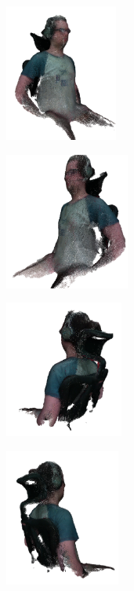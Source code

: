 \begin{figure}[h]
    \centering
    \begin{subfigure}[t]{0.2\textheight}
    	\centering
        \includegraphics[height=4.5cm]{archivos/experimentacion-4-resultado-nube.png}
    \end{subfigure}
    \begin{subfigure}[t]{0.2\textheight}
    	\centering
        \includegraphics[height=4.5cm]{archivos/experimentacion-4-resultado-nube-2.png}
    \end{subfigure}
    \begin{subfigure}[t]{0.2\textheight}
    	\centering
        \includegraphics[height=4.5cm]{archivos/experimentacion-4-resultado-nube-3.png}
    \end{subfigure}
    \begin{subfigure}[t]{0.2\textheight}
    	\centering
        \includegraphics[height=4.5cm]{archivos/experimentacion-4-resultado-nube-4.png}

\end{subfigure}
\end{figure}
